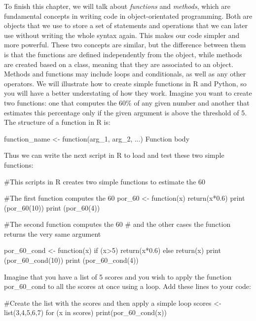 To finish this chapter, we will talk about \emph{functions} and \emph{methods}, which are fundamental concepts in writing code in object-orientated programming. Both are objects that we use to store a set of statements and operations that we can later use without writing the whole syntax again. This makes our code simpler and more powerful. These two concepts are similar, but the difference between them is that the functions are defined independently from the object, while methods are created based on a class, meaning that they are associated to an object. Methods and functions may include loops and conditionals, as well as any other operators.  We will illustrate how to create simple functions in R and Python, so you will have a better understating of how they work. Imagine you want to create two functions: one that computes the 60\% of any given number and another that estimates this percentage only if the given argument is above the threshold of 5. The structure of a function in R is:

\begin{exampler}
function_name <- function(arg_1, arg_2, ...) {
   Function body 
}
\end{exampler}

Thus we can write the next script in R to load and test these two simple functions:

\begin{exampler}
#This scripts in R creates two simple functions to estimate the 60%

#The first function computes the 60%
por_60 <- function(x) {
  return(x*0.6) 
}
print (por_60(10))
print (por_60(4))

#The second function computes the 60%
# and the other cases the function returns the very same argument

por_60_cond <- function(x) {
  if (x>5) {
    return(x*0.6)
  } else {
    return(x)
  }
}
print (por_60_cond(10))
print (por_60_cond(4))
\end{exampler}

Imagine that you have a list of 5 scores and you wish to apply the function por\_60\_cond to all the scores at once using a loop. Add these lines to your code:

\begin{exampler}
#Create the list with the scores and then apply a simple loop
scores <- list(3,4,5,6,7)
for (x in scores)
{
  print(por_60_cond(x))
}
\end{exampler}

